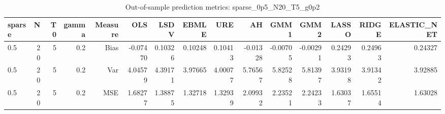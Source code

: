 \begin{table}[!htbp]\centering
\caption{Out-of-sample prediction metrics: sparse_0p5_N20_T5_g0p2}
\label{tab:table3_sparse_0p5_N20_T5_g0p2}
\begin{tabular}{lrrrrrrrrrrrrrr}
\hline
sparse & N & T0 & gamma & Measure & OLS & LSDV & EBMLE & URE & AH & GMM1 & GMM2 & LASSO & RIDGE & ELASTIC_NET \\
\hline
0.5 & 20 & 5 & 0.2 & Bias & -0.07470 & 0.10326 & 0.10248 & 0.10413 & -0.01328 & -0.00705 & -0.00291 & 0.24293 & 0.24963 & 0.24327 \\
0.5 & 20 & 5 & 0.2 & Var & 4.04579 & 4.39171 & 3.97665 & 4.00077 & 5.76567 & 5.82528 & 5.81397 & 3.93198 & 3.91342 & 3.92885 \\
0.5 & 20 & 5 & 0.2 & MSE & 1.68277 & 1.38875 & 1.32718 & 1.32939 & 2.09932 & 2.23521 & 2.24233 & 1.63037 & 1.65514 & 1.63028 \\
\hline
\end{tabular}
\end{table}

